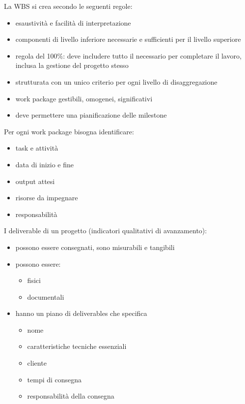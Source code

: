 \documentclass[answers, a4paper, 11pt]{exam}
\begin{document}
La WBS si crea secondo le seguenti regole:

\begin{itemize}
    \item esaustività e facilità di interpretazione
    \item componenti di livello inferiore necessarie e sufficienti per il livello superiore
    \item regola del 100\%: deve includere tutto il necessario per completare il lavoro, inclusa la gestione del progetto stesso
    \item strutturata con un unico criterio per ogni livello di disaggregazione
    \item work package gestibili, omogenei, significativi
    \item deve permettere una pianificazione delle milestone
\end{itemize}

Per ogni work package bisogna identificare:

\begin{itemize}
    \item task e attività
    \item data di inizio e fine
    \item output attesi
    \item risorse da impegnare
    \item responsabilità
\end{itemize}

I deliverable di un progetto (indicatori qualitativi di avanzamento):

\begin{itemize}
    \item possono essere consegnati, sono misurabili e tangibili
    \item possono essere:
    \begin{itemize}
        \item fisici
        \item documentali
    \end{itemize}
    \item hanno un piano di deliverables che specifica
    \begin{itemize}
        \item nome
        \item caratteristiche tecniche essenziali
        \item cliente
        \item tempi di consegna
        \item responsabilità della consegna
    \end{itemize}
\end{itemize}
\end{document}

